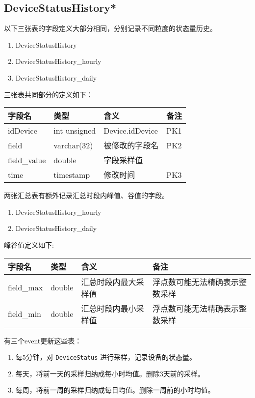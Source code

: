\subsection{DeviceStatusHistory*}\label{devicestatushistory}

以下三张表的字段定义大部分相同，分别记录不同粒度的状态量历史。

\begin{enumerate}
\def\labelenumi{\arabic{enumi}.}
\itemsep1pt\parskip0pt
\item
  DeviceStatusHistory
\item
  DeviceStatusHistory\_hourly
\item
  DeviceStatusHistory\_daily
\end{enumerate}

三张表共同部分的定义如下：

\begin{longtabu}[c]{@{}lXXX@{}}
\toprule
字段名 & 类型 & 含义 & 备注\tabularnewline
\midrule
\endhead
idDevice & int unsigned & Device.idDevice & PK1\tabularnewline
field & varchar(32) & 被修改的字段名 & PK2\tabularnewline
field\_value & double & 字段采样值 &\tabularnewline
time & timestamp & 修改时间 & PK3\tabularnewline
\bottomrule
\end{longtabu}

两张汇总表有额外记录汇总时段内峰值、谷值的字段。

\begin{enumerate}
\def\labelenumi{\arabic{enumi}.}
\itemsep1pt\parskip0pt
\item
  DeviceStatusHistory\_hourly
\item
  DeviceStatusHistory\_daily
\end{enumerate}

峰谷值定义如下:

\begin{longtabu}[c]{@{}lXXX@{}}
\toprule
字段名 & 类型 & 含义 & 备注\tabularnewline
\midrule
\endhead
field\_max & double & 汇总时段内最大采样值 &
浮点数可能无法精确表示整数采样\tabularnewline
field\_min & double & 汇总时段内最小采样值 &
浮点数可能无法精确表示整数采样\tabularnewline
\bottomrule
\end{longtabu}

有三个event更新这些表：

\begin{enumerate}
\def\labelenumi{\arabic{enumi}.}
\itemsep1pt\parskip0pt
\item
  每5分钟，对 \texttt{DeviceStatus} 进行采样，记录设备的状态量。
\item
  每天，将前一天的采样归纳成每小时均值。删除3天前的采样。
\item
  每周，将前一周的采样归纳成每日均值。删除一周前的小时均值。
\end{enumerate}

